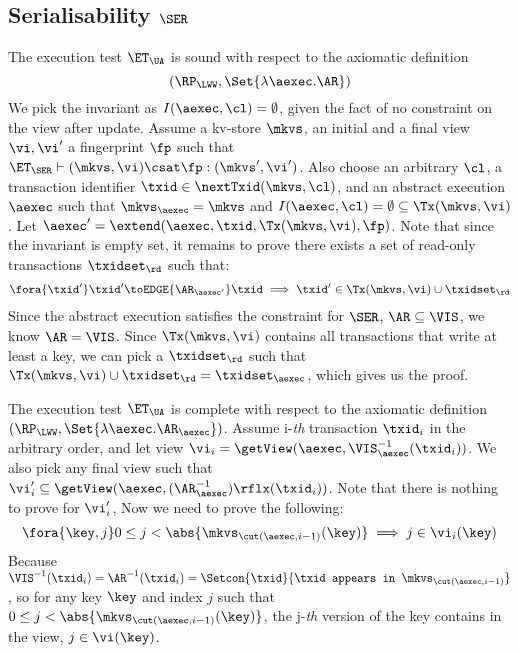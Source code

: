 \subsection{Serialisability \( \SER \)}
\label{sec:sound-complete-ser}

The execution test $\ET_\UA$ is sound with respect to the axiomatic definition 
\[ 
    (\RP_{\LWW}, \Set{\lambda \aexec. \AR })
\]
We pick the invariant as \( I( \aexec, \cl ) = \emptyset \), given the fact of no constraint on the view after update.
Assume a kv-store $\mkvs$, an initial and a final view $\vi, \vi'$  a fingerprint $\fp$ 
such that $\ET_{\SER} \vdash (\mkvs, \vi) \csat \fp: (\mkvs',\vi')$. 
Also choose an arbitrary $\cl$, a transaction identifier $\txid \in \nextTxid(\mkvs, \cl)$, 
and an abstract execution $\aexec$ such that $\mkvs_{\aexec} = \mkvs$ and 
\( I(\aexec, \cl) =  \emptyset \subseteq \Tx(\mkvs, \vi) \).
Let \( \aexec' = \extend(\aexec, \txid, \Tx(\mkvs, \vi), \fp ) \).
Note that since the invariant is empty set, it remains to prove there exists a set of read-only transactions \( \txidset_\rd \) such that:
\[
    \begin{array}{@{}l@{}}
        \fora{ \txid' } 
        \txid' \toEDGE{\AR_{\aexec'}} \txid \implies \txid' \in \Tx(\mkvs, \vi) \cup \txidset_\rd
    \end{array}
\]
Since the abstract execution satisfies the constraint for \( \SER \), \ie \( \AR \subseteq \VIS \), we know \( \AR = \VIS \).
Since \( \Tx(\mkvs, \vi)  \) contains all transactions that write at least a key, 
we can pick a \( \txidset_\rd \) such that \( \Tx(\mkvs, \vi) \cup \txidset_\rd = \txidset_\aexec\),
which gives us the proof.


The execution test $\ET_\UA$ is complete with respect to the axiomatic definition \( (\RP_{\LWW}, \Set{\lambda \aexec. \AR_\aexec }) \).
Assume i-\emph{th} transaction \( \txid_i \) in the arbitrary order,
and let view \( \vi_{i} = \getView(\aexec, \VIS^{-1}_{\aexec}(\txid_{i}) ) \).
We also pick any final view such that \( \vi'_{i} \subseteq \getView(\aexec, (\AR^{-1}_{\aexec})\rflx(\txid_{i}) ) \).
Note that there is nothing to prove for \( \vi'_i \),
Now we need to prove the following:
\[
    \fora{\key, j}  0 \leq j < \abs{\mkvs_{\cut(\aexec, i-1)}(\key)} \implies j \in \vi_i(\key)
\]
Because \( \VIS^{-1}(\txid_i) = \AR^{-1}(\txid_i) = \Setcon{\txid }{\txid \texttt{ appears in } \mkvs_{\cut(\aexec, i-1)} }\),
so for any key \( \key \) and index \( j \) such that \( 0 \leq j < \abs{\mkvs_{\cut(\aexec, i-1)}(\key)} \),
the j-\emph{th} version of the key contains in the view, \ie \( j \in \vi(\key)\).


